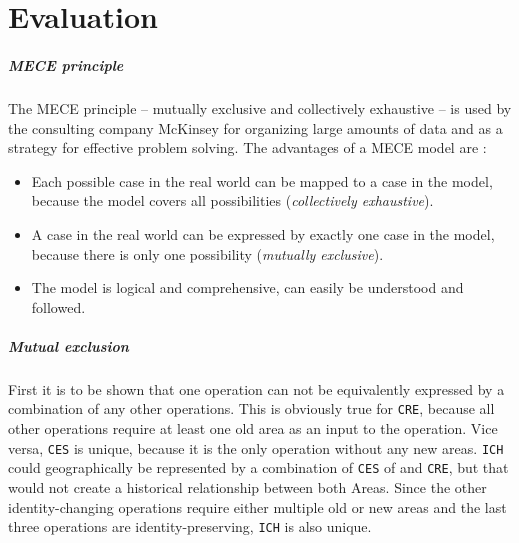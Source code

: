 
\chapter{Evaluation} %
\label{cha:evaluation}


\paragraph{MECE principle} %
\label{par:mece_principle}

The MECE principle -- mutually exclusive and collectively exhaustive -- is used by the consulting company McKinsey for organizing large amounts of data and as a strategy for effective problem solving. The advantages of a MECE model are \cite{mece}:
\begin{itemize}
  \item Each possible case in the real world can be mapped to a case in the model, because the model covers all possibilities (\emph{collectively exhaustive}).
  \item A case in the real world can be expressed by exactly one case in the model, because there is only one possibility (\emph{mutually exclusive}).
  \item The model is logical and comprehensive, can easily be understood and followed.
\end{itemize}


\paragraph{Mutual exclusion} %
\label{par:mutual_exclusion}

First it is to be shown that one operation can not be equivalently expressed by a combination of any other operations. This is obviously true for \texttt{CRE}, because all other operations require at least one old area as an input to the operation. Vice versa, \texttt{CES} is unique, because it is the only operation without any new areas. \texttt{ICH} could geographically be represented by a combination of \texttt{CES} of and \texttt{CRE}, but that would not create a historical relationship between both Areas. Since the other identity-changing operations require either multiple old or new areas and the last three operations are identity-preserving, \texttt{ICH} is also unique.

